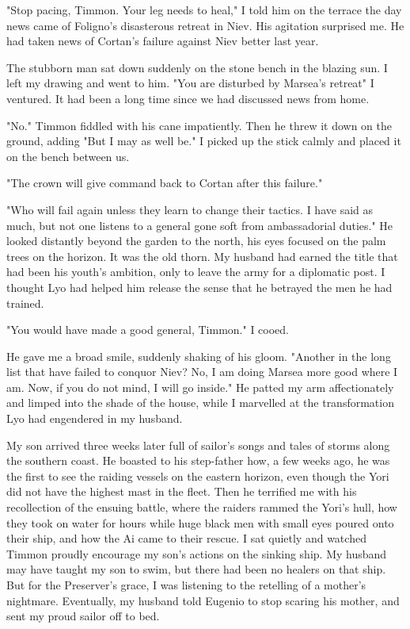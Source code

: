 \documentclass{article}
\begin{document}
"Stop pacing, Timmon. Your leg needs to heal," I told him on the terrace the day news came of Foligno's disasterous retreat in Niev. His agitation surprised me. He had taken news of Cortan's failure against Niev better last year.

The stubborn man sat down suddenly on the stone bench in the blazing sun. I left my drawing and went to him. "You are disturbed by Marsea's retreat" I ventured. It had been a long time since we had discussed news from home. 

"No." Timmon fiddled with his cane impatiently. Then he threw it down on the ground, adding "But I may as well be." I picked up the stick calmly and placed it on the bench between us.

"The crown will give command back to Cortan after this failure."

"Who will fail again unless they learn to change their tactics. I have said as much, but not one listens to a general gone soft from ambassadorial duties." He looked distantly beyond the garden to the north, his eyes focused on the palm trees on the horizon. It was the old thorn. My husband had earned the title that had been his youth's ambition, only to leave the army for a diplomatic post. I thought Lyo had helped him release the sense that he betrayed the men he had trained.

"You would have made a good general, Timmon." I cooed.

He gave me a broad smile, suddenly shaking of his gloom. "Another in the long list that have failed to conquor Niev? No, I am doing Marsea more good where I am. Now, if you do not mind, I will go inside." He patted my arm affectionately and limped into the shade of the house, while I marvelled at the transformation Lyo had engendered in my husband.

My son arrived three weeks later full of sailor's songs and tales of storms along the southern coast. He boasted to his step-father how, a few weeks ago, he was the first to see the raiding vessels on the eastern horizon, even though the Yori did not have the highest mast in the fleet. Then he terrified me with his recollection of the ensuing battle, where the raiders rammed the Yori's hull, how they took on water for hours while huge black men with small eyes poured onto their ship, and how the Ai came to their rescue. I sat quietly and watched Timmon proudly encourage my son's actions on the sinking ship. My husband may have taught my son to swim, but there had been no healers on that ship. But for the Preserver's grace, I was listening to the retelling of a mother's nightmare. Eventually, my husband told Eugenio to stop scaring his mother, and sent my proud sailor off to bed. 
\end{document}
